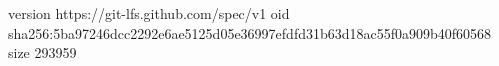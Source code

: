 version https://git-lfs.github.com/spec/v1
oid sha256:5ba97246dcc2292e6ae5125d05e36997efdfd31b63d18ac55f0a909b40f60568
size 293959
